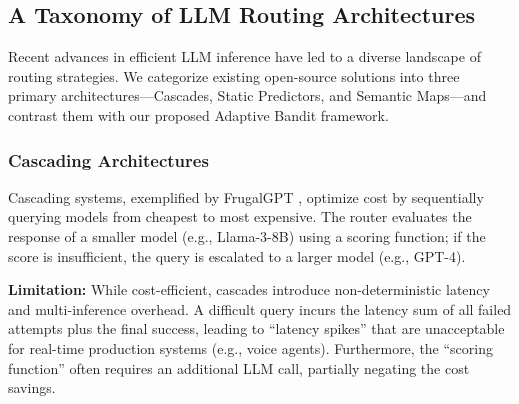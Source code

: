 \begin{table}[h]
\centering
\caption{Summary Comparison of Bandit Routers}
\label{tab:comparison}
\end{table}

\subsection{A Taxonomy of LLM Routing Architectures}

Recent advances in efficient LLM inference have led to a diverse landscape of routing strategies. We categorize existing open-source solutions into three primary architectures—Cascades, Static Predictors, and Semantic Maps—and contrast them with our proposed Adaptive Bandit framework.

\subsubsection{Cascading Architectures}

Cascading systems, exemplified by FrugalGPT \cite{chen2023frugalgpt}, optimize cost by sequentially querying models from cheapest to most expensive. The router evaluates the response of a smaller model (e.g., Llama-3-8B) using a scoring function; if the score is insufficient, the query is escalated to a larger model (e.g., GPT-4).

\noindent \textbf{Limitation:} While cost-efficient, cascades introduce non-deterministic latency and multi-inference overhead. A difficult query incurs the latency sum of all failed attempts plus the final success, leading to ``latency spikes'' that are unacceptable for real-time production systems (e.g., voice agents). Furthermore, the ``scoring function'' often requires an additional LLM call, partially negating the cost savings.

